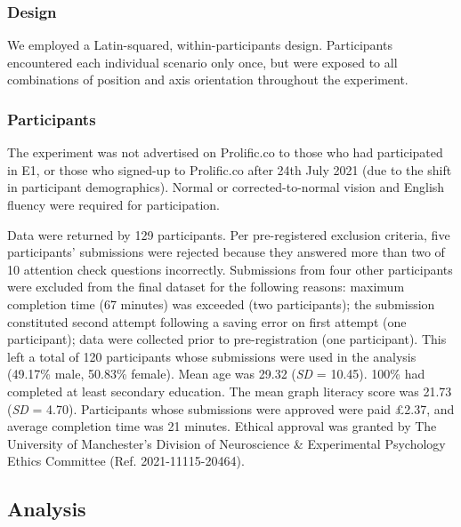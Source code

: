 \documentclass[journal]{vgtc}                %
\begin{document}
\hypertarget{design-1}{%
\subsubsection{Design}\label{design-1}}

We employed a Latin-squared, within-participants design. Participants
encountered each individual scenario only once, but were exposed to all
combinations of position and axis orientation throughout the experiment.

\hypertarget{participants-1}{%
\subsubsection{Participants}\label{participants-1}}

The experiment was not advertised on Prolific.co to those who had
participated in E1, or those who signed-up to Prolific.co after 24th
July 2021 (due to the shift in participant demographics). Normal or
corrected-to-normal vision and English fluency were required for
participation.

Data were returned by 129 participants. Per pre-registered exclusion
criteria, five participants' submissions were rejected because they
answered more than two of 10 attention check questions incorrectly.
Submissions from four other participants were excluded from the final
dataset for the following reasons: maximum completion time (67 minutes)
was exceeded (two participants); the submission constituted second
attempt following a saving error on first attempt (one participant);
data were collected prior to pre-registration (one participant). This
left a total of 120 participants whose submissions were used in the
analysis (49.17\% male, 50.83\%
female). Mean age was 29.32 (\emph{SD} =
10.45). 100\% had
completed at least secondary education. The mean graph literacy score
was 21.73 (\emph{SD} =
4.70). Participants whose submissions were
approved were paid £2.37, and average completion time was
21 minutes. Ethical approval was
granted by The University of Manchester's Division of Neuroscience \&
Experimental Psychology Ethics Committee (Ref. 2021-11115-20464).

\hypertarget{analysis-1}{%
\subsection{Analysis}\label{analysis-1}}
\end{document}
